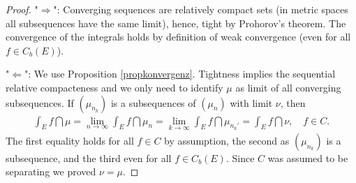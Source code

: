 \begin{proof}[Proof]
	"{}$\Rightarrow$": Converging sequences are relatively compact sets (in metric spaces all subsequences have the same limit), hence, tight by Prohorov's theorem. The convergence of the integrals holds by definition of weak convergence (even for all $f\in C_b(E)$).\smallskip	
	
	
	"{}$\Leftarrow$": We use Proposition \ref{propkonvergenz}. Tightness implies the sequential relative compacteness and we only need to identify $\mu$ as limit of all converging subsequences. If $(\mu_{n_k})$ is a subsequences of $(\mu_n)$ with limit $\nu$, then
\begin{align*}
	\int_E f \dint \mu=\lim_{n\to\infty} \int_E f \dint \mu_{n}=\lim_{k\to\infty} \int_E f \dint \mu_{n_k'}=\int_E f \dint \nu,\quad f\in C.
\end{align*}
The first equality holds for all $f\in C$ by assumption, the second as $(\mu_{n_k})$ is a subsequence, and the third even for all $f\in C_b(E)$. Since $C$ was assumed to be separating we proved $\nu=\mu$. 
%
%	
%	
\end{proof}


